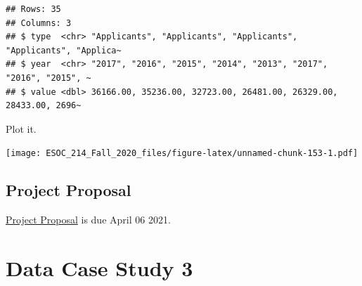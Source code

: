 \documentclass[
]{book}
\newenvironment{Shaded}{\begin{snugshade}}{\end{snugshade}}
\newcommand{\DataTypeTok}[1]{\textcolor[rgb]{0.13,0.29,0.53}{#1}}
\newcommand{\KeywordTok}[1]{\textcolor[rgb]{0.13,0.29,0.53}{\textbf{#1}}}
\newcommand{\NormalTok}[1]{#1}
\newcommand{\OperatorTok}[1]{\textcolor[rgb]{0.81,0.36,0.00}{\textbf{#1}}}
\newcommand{\OtherTok}[1]{\textcolor[rgb]{0.56,0.35,0.01}{#1}}
\newcommand{\StringTok}[1]{\textcolor[rgb]{0.31,0.60,0.02}{#1}}
\begin{document}
\begin{verbatim}
## Rows: 35
## Columns: 3
## $ type  <chr> "Applicants", "Applicants", "Applicants", "Applicants", "Applica~
## $ year  <chr> "2017", "2016", "2015", "2014", "2013", "2017", "2016", "2015", ~
## $ value <dbl> 36166.00, 35236.00, 32723.00, 26481.00, 26329.00, 28433.00, 2696~
\end{verbatim}

Plot it.

\begin{Shaded}
\end{Shaded}

\texttt{[image: ESOC\_214\_Fall\_2020\_files/figure-latex/unnamed-chunk-153-1.pdf]}

\hypertarget{project-proposal}{%
\section{Project Proposal}\label{project-proposal}}

\href{final_project_docs/esoc214_project_proposal.pdf}{Project Proposal} is due April 06 2021.

\hypertarget{data-case-study-3}{%
\chapter{Data Case Study 3}\label{data-case-study-3}}
\end{document}
